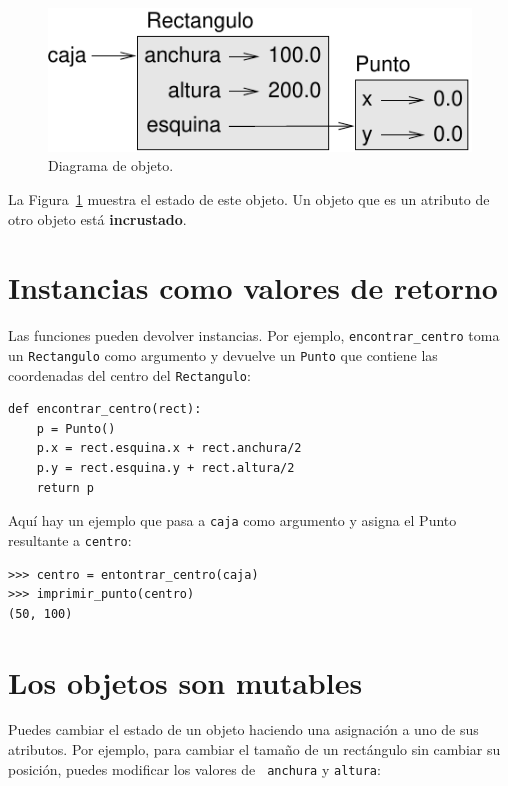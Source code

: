 \documentclass[10pt]{book}
\begin{document}
\begin{figure}
\centerline
{\includegraphics[scale=0.8]{figs/rectangle.pdf}}
\caption{Diagrama de objeto.}
\label{fig.rectangle}
\end{figure}


La Figura~\ref{fig.rectangle} muestra el estado de este objeto.
Un objeto que es un atributo de otro objeto está {\bf incrustado}.


\section{Instancias como valores de retorno}

Las funciones pueden devolver instancias.  Por ejemplo, \verb"encontrar_centro"
toma un {\tt Rectangulo} como argumento y devuelve un {\tt Punto}
que contiene las coordenadas del centro del {\tt Rectangulo}:

\begin{verbatim}
def encontrar_centro(rect):
    p = Punto()
    p.x = rect.esquina.x + rect.anchura/2
    p.y = rect.esquina.y + rect.altura/2
    return p
\end{verbatim}
%
Aquí hay un ejemplo que pasa a {\tt caja} como argumento y asigna
el Punto resultante a {\tt centro}:

\begin{verbatim}
>>> centro = entontrar_centro(caja)
>>> imprimir_punto(centro)
(50, 100)
\end{verbatim}
%

\section{Los objetos son mutables}

Puedes cambiar el estado de un objeto haciendo una asignación a uno de
sus atributos.  Por ejemplo, para cambiar el tamaño de un rectángulo
sin cambiar su posición, puedes modificar los valores de {\tt
anchura} y {\tt altura}:
\end{document}
